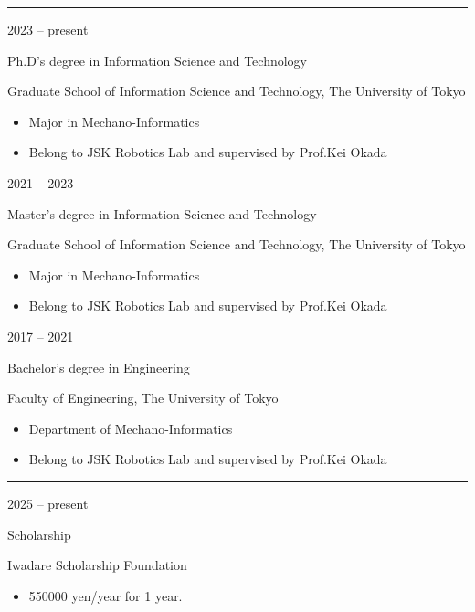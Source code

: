 \documentclass[a4paper,10pt]{article}
\newlength{\cvcolumngapwidth}
\newlength{\cvleftcolumnwidth}
\newlength{\cvrightcolumnwidth}
\newcommand{\cvsectionstyle}[1]{{\normalsize\cvsectionfont\textcolor{cvsectioncolor}{#1}}}
\newcommand{\cvtitlestyle}[1]{{\large\cvtitlefont\textcolor{cvtitlecolor}{#1}}}
\newcommand{\cvdurationstyle}[1]{{\small\cvdurationfont\textcolor{cvdurationcolor}{#1}}}
\newlength{\cvafteritemskipamount}
\newlength{\cvaftersectionskipamount}
\newlength{\cvaftertitleskipamount}
\newlength{\cvparskip}
\newcommand{\cvsection}[1]{
    \begin{minipage}[t]{\cvleftcolumnwidth}
        \raggedleft\cvsectionstyle{#1}
    \end{minipage}%
    \hspace{\cvcolumngapwidth}%
    \begin{minipage}[t]{\cvrightcolumnwidth}
        \textcolor{cvrulecolor}{\rule{\cvrightcolumnwidth}{0.3mm}}
    \end{minipage}

    \vspace{\cvaftersectionskipamount}
}
\newcommand{\cvitem}[2]{
    \begin{minipage}[t]{\cvleftcolumnwidth}
        \raggedleft #1
    \end{minipage}%
    \hspace{\cvcolumngapwidth}%
    \begin{minipage}[t]{\cvrightcolumnwidth}
        \setlength{\parskip}{\cvparskip} #2
    \end{minipage}

    \vspace{\cvafteritemskipamount}
}
\newcommand{\cvtitle}[1]{
    \cvtitlestyle{#1}

    \vspace{\cvaftertitleskipamount}
    \vspace{-\cvparskip}
}
\begin{document}

\cvsection{EDUCATION}

\cvitem{
    \cvdurationstyle{2023 -- present}
}{
    \cvtitle{Ph.D's degree in Information Science and Technology}

    Graduate School of Information Science and Technology, The University of Tokyo

    \begin{itemize}[leftmargin=*]
        \item Major in Mechano-Informatics
        \item Belong to JSK Robotics Lab and supervised by Prof.Kei Okada
    \end{itemize}
}

\cvitem{
    \cvdurationstyle{2021 -- 2023}
}{
    \cvtitle{Master's degree in Information Science and Technology}

    Graduate School of Information Science and Technology, The University of Tokyo

    \begin{itemize}[leftmargin=*]
        \item Major in Mechano-Informatics
        \item Belong to JSK Robotics Lab and supervised by Prof.Kei Okada
    \end{itemize}
}

\cvitem{
    \cvdurationstyle{2017 -- 2021}
}{
    \cvtitle{Bachelor's degree in Engineering}

    Faculty of Engineering, The University of Tokyo

    \begin{itemize}[leftmargin=*]
        \item Department of Mechano-Informatics
        \item Belong to JSK Robotics Lab and supervised by Prof.Kei Okada
    \end{itemize}
}


\cvsection{SCHOLARSHIPS}

\cvitem{
    \cvdurationstyle{2025 -- present}
}{
    \cvtitle{Scholarship}

    Iwadare Scholarship Foundation

    \begin{itemize}[leftmargin=*]
        \item 550000 yen/year for 1 year.
    \end{itemize}
}
\end{document}
